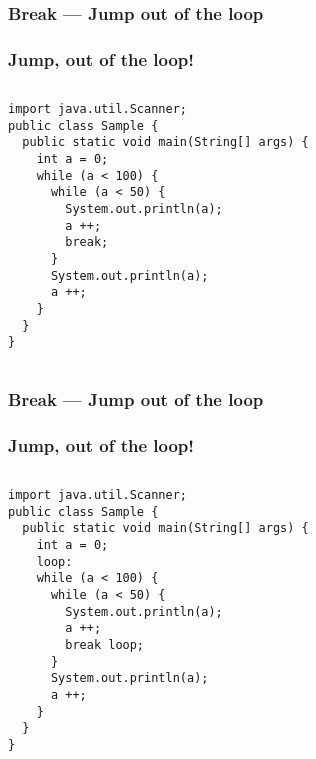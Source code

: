 \documentclass[en, 11pt, xcolor=dvipsnames]{beamer}
\begin{document}
\subsubsection{Break --- Jump out of the loop}
\begin{frame}[fragile]
	\frametitle{Jump, out of the loop!}



	\begin{columns}[c]
		\begin{column}{0.9\textwidth}

			\begin{lstlisting}[style=Java]
import java.util.Scanner;
public class Sample {
  public static void main(String[] args) {
    int a = 0;
    while (a < 100) {
      while (a < 50) {
        System.out.println(a);
        a ++;
        break;
      }
      System.out.println(a);
      a ++;
    }
  }
}\end{lstlisting}

		\end{column}
	\end{columns}

\end{frame}

\subsubsection{Break --- Jump out of the loop}
\begin{frame}[fragile]
	\frametitle{Jump, out of the loop!}



	\begin{columns}[c]
		\begin{column}{0.9\textwidth}

			\begin{lstlisting}[style=Java]
import java.util.Scanner;
public class Sample {
  public static void main(String[] args) {
    int a = 0;
    loop:
    while (a < 100) {
      while (a < 50) {
        System.out.println(a);
        a ++;
        break loop;
      }
      System.out.println(a);
      a ++;
    }
  }
}\end{lstlisting}

		\end{column}
	\end{columns}

\end{frame}
\end{document}
